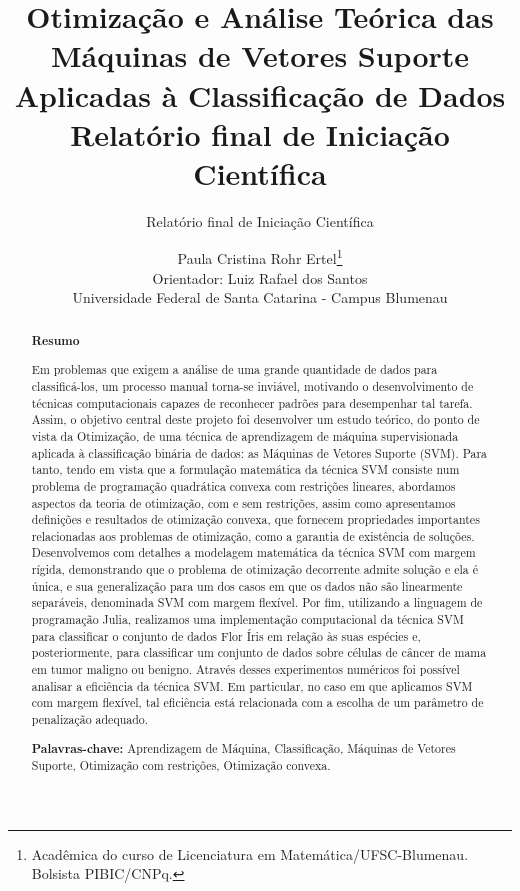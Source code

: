 \documentclass[12pt,a4paper]{scrartcl}
\theoremstyle{definition}%
\begin{document}
\title{Otimização e Análise Teórica das Máquinas de Vetores Suporte Aplicadas à Classificação de Dados\\ {\small Relatório final de Iniciação Científica}} 
\author{ \normalfont Paula Cristina Rohr Ertel\thanks{Acadêmica do curso de Licenciatura em Matemática/UFSC-Blumenau. Bolsista PIBIC/CNPq.} \\ \small Orientador: Luiz Rafael dos Santos \\ \small Universidade Federal de Santa Catarina - Campus Blumenau}
\subtitle{Relatório final de Iniciação Científica}
\maketitle

\begin{abstract}

\begin{center}
\textbf{Resumo}
\end{center}

Em problemas que exigem a análise de uma grande quantidade de dados para classificá-los, um processo manual torna-se inviável, motivando o desenvolvimento de técnicas computacionais capazes de reconhecer padrões para desempenhar tal tarefa. Assim, o objetivo central deste projeto foi desenvolver um estudo teórico, do ponto de vista da Otimização, de uma técnica de aprendizagem de máquina supervisionada aplicada à classificação binária de dados: as Máquinas de Vetores Suporte (SVM). Para tanto, tendo em vista que a formulação matemática da técnica SVM consiste num problema de programação quadrática convexa com restrições lineares, abordamos aspectos da teoria de otimização, com e sem restrições, assim como apresentamos definições e resultados de otimização convexa, que fornecem propriedades importantes relacionadas aos problemas de otimização, como a garantia de existência de soluções. Desenvolvemos com detalhes a modelagem matemática da técnica SVM com margem rígida, demonstrando que o problema de otimização decorrente admite solução e ela é única, e sua generalização para um dos casos em que os dados não são linearmente separáveis, denominada SVM com margem flexível. Por fim, utilizando a linguagem de programação Julia, realizamos uma implementação computacional da técnica SVM para classificar o conjunto de dados Flor Íris em relação às suas espécies e, posteriormente, para classificar um conjunto de dados sobre células de câncer de mama em tumor maligno ou benigno. Através desses experimentos numéricos foi possível analisar a eficiência da técnica SVM. Em particular, no caso em que aplicamos SVM com margem flexível, tal eficiência está relacionada com a escolha de um parâmetro de penalização adequado.

\textbf{Palavras-chave:} Aprendizagem de Máquina, Classificação, Máquinas de Vetores Suporte, Otimização com restrições, Otimização convexa.
\end{abstract}
\end{document}
